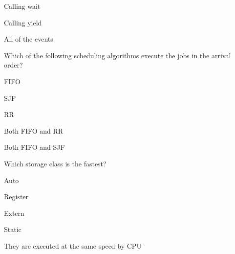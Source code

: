 \begin{questions}
\begin{verticalchoices}
\item Calling wait
\item Calling yield
\item All of the events
\end{verticalchoices}
\question Which of the following scheduling algorithms execute the jobs in the arrival order?
\begin{verticalchoices}
\item FIFO
\item SJF
\item RR
\item Both FIFO and RR
\item Both FIFO and SJF
\end{verticalchoices}
\question Which storage class is the fastest?
\begin{verticalchoices}
\item Auto
\item Register
\item Extern
\item Static
\item They are executed at the same speed by CPU
\end{verticalchoices}
\end{questions}\vfill\newpage

